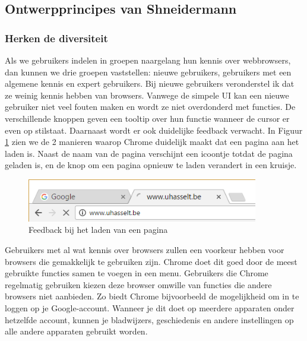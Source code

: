 \documentclass[12pt]{article}
\begin{document}
\subsection{Ontwerpprincipes van Shneidermann}
\subsubsection{Herken de diversiteit}
Als we gebruikers indelen in groepen naargelang hun kennis over webbrowsers, dan kunnen we drie groepen vaststellen: nieuwe gebruikers, gebruikers met een algemene kennis en expert gebruikers. Bij nieuwe gebruikers veronderstel ik dat ze weinig kennis hebben van browsers. Vanwege de simpele UI kan een nieuwe gebruiker niet veel fouten maken en wordt ze niet overdonderd met functies. De verschillende knoppen geven een tooltip over hun functie wanneer de cursor er even op stilstaat. Daarnaast wordt er ook duidelijke feedback verwacht. In Figuur \ref{fig:paginaLaden} zien we de 2 manieren waarop Chrome duidelijk maakt dat een pagina aan het laden is. Naast de naam van de pagina verschijnt een icoontje totdat de pagina geladen is, en de knop om een pagina opnieuw te laden verandert in een kruisje.
\begin{figure}
	\centering
	\includegraphics[width=0.9\textwidth]{imgPaginaLaden.png}
	\caption{Feedback bij het laden van een pagina}
	\label{fig:paginaLaden}
\end{figure}
\linebreak
Gebruikers met al wat kennis over browsers zullen een voorkeur hebben voor browsers die gemakkelijk te gebruiken zijn. Chrome doet dit goed door de meest gebruikte functies samen te voegen in een menu. 
\linebreak
Gebruikers die Chrome regelmatig gebruiken kiezen deze browser omwille van functies die andere browsers niet aanbieden. Zo biedt Chrome bijvoorbeeld de mogelijkheid om in te loggen op je Google-account. Wanneer je dit doet op meerdere apparaten onder hetzelfde account, kunnen je bladwijzers, geschiedenis en andere instellingen op alle andere apparaten gebruikt worden.
\end{document}

